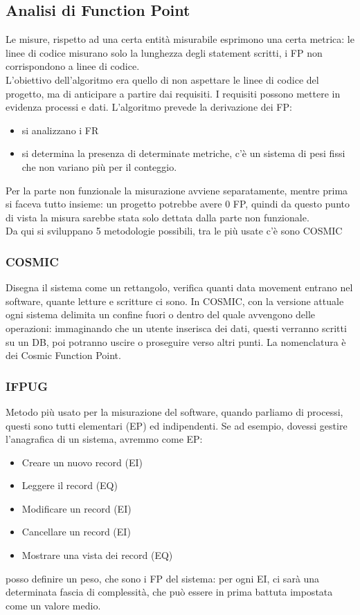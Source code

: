\documentclass{article}
\begin{document}
\subsection{Analisi di Function Point}
Le misure, rispetto ad una certa entità misurabile esprimono una certa metrica: le linee di codice misurano solo la lunghezza degli statement scritti, i FP non corrispondono a linee di codice.\\ L'obiettivo dell'algoritmo era quello di non aspettare le linee di codice del progetto, ma di anticipare a partire dai requisiti. I requisiti possono mettere in evidenza processi e dati. L'algoritmo prevede la derivazione dei FP:
\begin{itemize}
\item si analizzano i FR
\item si determina la presenza di determinate metriche, c'è un sistema di pesi fissi che non variano più per il conteggio.
\end{itemize}
Per la parte non funzionale la misurazione avviene separatamente, mentre prima si faceva tutto insieme: un progetto potrebbe avere 0 FP, quindi da questo punto di vista la misura sarebbe stata solo dettata dalla parte non funzionale.\\ Da qui si sviluppano 5 metodologie possibili, tra le più usate c'è sono COSMIC
\subsubsection{COSMIC}
Disegna il sistema come un rettangolo, verifica quanti data movement entrano nel software, quante letture e scritture ci sono. In COSMIC, con la versione attuale ogni sistema delimita un confine fuori o dentro del quale avvengono delle operazioni: immaginando che un utente inserisca dei dati, questi verranno scritti su un DB, poi potranno uscire o proseguire verso altri punti. La nomenclatura è dei Cosmic Function Point.
\subsubsection{IFPUG}
Metodo più usato per la misurazione del software, quando parliamo di processi, questi sono tutti elementari (EP) ed indipendenti. Se ad esempio, dovessi gestire l'anagrafica di un sistema, avremmo come EP:
\begin{itemize}
\item Creare un nuovo record (EI)
\item Leggere il record (EQ)
\item Modificare un record (EI)
\item Cancellare un record (EI)
\item Mostrare una vista dei record (EQ)
\end{itemize}
posso definire un peso, che sono i FP del sistema: per ogni EI, ci sarà una determinata fascia di complessità, che può essere in prima battuta impostata come un valore medio.
\end{document}
